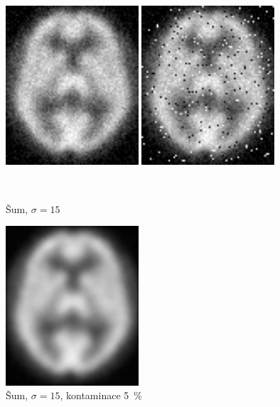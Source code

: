      \begin{figure}[H]
        \begin{minipage}[l]{0.5\textwidth}
            \center
            \includegraphics[width = 140pt]{src/8Appendix/final/15-50noise.png}
        \end{minipage}
        \begin{minipage}[r]{0.5\textwidth}
            \center
            \includegraphics[width = 140pt]{src/8Appendix/final/15-50contaminated.png}
        \end{minipage}
        \\
        \begin{minipage}[l]{0.5\textwidth}
            \caption{Šum, $\sigma = 15$}
        \end{minipage}
        \begin{minipage}[r]{0.5\textwidth}
            \caption{Šum, $\sigma = 15$, kontaminace 5~\%}
        \end{minipage}
        \begin{minipage}[l]{0.5\textwidth}
            \center
            \includegraphics[width = 140pt]{src/8Appendix/final/15-50wbesL.png}

\end{minipage}
\end{figure}
